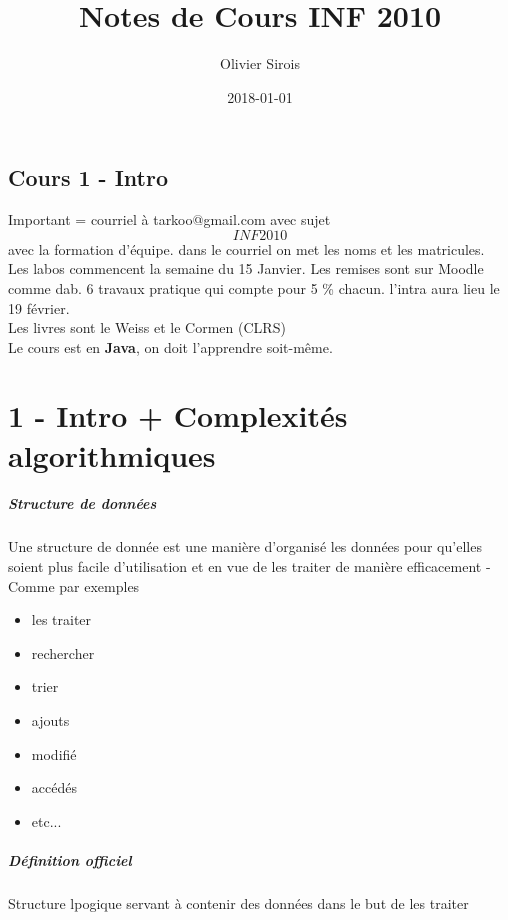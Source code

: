 \documentclass[oneside]{book}
\title{Notes de Cours INF 2010}
\date{2018-01-01}
\author{Olivier Sirois}
\begin{document}
\setcounter{page}{1}
\maketitle
\tableofcontents

\section{Cours 1 - Intro}
Important = courriel à tarkoo@gmail.com avec sujet \[INF2010\] avec la formation d'équipe. dans le courriel on met les noms et les matricules.\\

Les labos commencent la semaine du 15 Janvier. Les remises sont sur Moodle comme dab. 6 travaux pratique qui compte pour 5 \% chacun. l'intra aura lieu le 19 février. \\

Les livres sont le Weiss et le Cormen (CLRS)\\

Le cours est en \textbf{Java}, on doit l'apprendre soit-même. 

\chapter{1 - Intro + Complexités algorithmiques}
\paragraph{Structure de données}
Une structure de donnée est une manière d'organisé les données pour qu'elles soient plus facile d'utilisation et en vue de les traiter de manière efficacement - Comme par exemples
\begin{itemize}
\item les traiter
\item rechercher
\item trier
\item ajouts
\item modifié
\item accédés
\item etc...
\end{itemize}

\paragraph{Définition officiel}
Structure lpogique servant à contenir des données dans le but de les traiter\\
\end{document}
